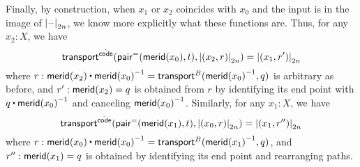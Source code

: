 Finally, by construction, when $x_1$ or $x_2$ coincides with $x_0$ and the input is in the image of $\mathopen{}\left|\mathord{\hspace{1pt}\text{--}\hspace{1pt}}\right|_{2n}^{}\mathclose{}$, we know more explicitly what these functions are.
Thus, for any $x_2:X$, we have
\begin{equation}
  \transfib{\hat{\code}}{\pairpath(\merid(x_0),t)}{\tproj{2n}{(x_2,r)}}
  =\tproj{2n}{(x_1,r')}\label{eq:freudcompute1}
\end{equation}
where $r:\merid(x_2) \ct \opp{\merid(x_0)} = \transfib{B}{\opp{\merid(x_0)}}{q}$ is arbitrary as before, and $r':\mathsf{merid}(x_2)=q$ is obtained from $r$ by identifying its end point with $q \ct \opp{\merid(x_0)}$ and canceling $\mathord{{\mathsf{merid}(x_0)}^{-1}}$.
Similarly, for any $x_1:X$, we have
\begin{equation}
  \transfib{\hat{\code}}{\pairpath(\merid(x_1),t)}{\tproj{2n}{(x_0,r)}}
  = \tproj{2n}{(x_1,r'')}\label{eq:freudcompute2}
\end{equation}
where $r:\merid(x_0) \ct \opp{\merid(x_0)} = \transfib{B}{\opp{\merid(x_1)}}{q}$, and $r'':\mathsf{merid}(x_1)=q$ is obtained by identifying its end point and rearranging paths.

